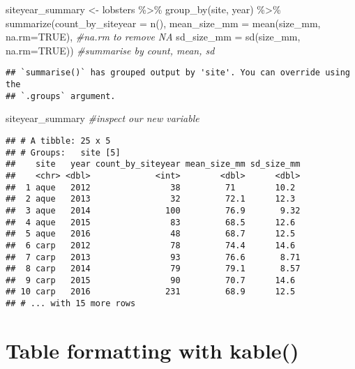 \documentclass[
]{article}
\newenvironment{Shaded}{\begin{snugshade}}{\end{snugshade}}
\newcommand{\AttributeTok}[1]{\textcolor[rgb]{0.77,0.63,0.00}{#1}}
\newcommand{\CommentTok}[1]{\textcolor[rgb]{0.56,0.35,0.01}{\textit{#1}}}
\newcommand{\ConstantTok}[1]{\textcolor[rgb]{0.00,0.00,0.00}{#1}}
\newcommand{\FunctionTok}[1]{\textcolor[rgb]{0.00,0.00,0.00}{#1}}
\newcommand{\NormalTok}[1]{#1}
\newcommand{\OtherTok}[1]{\textcolor[rgb]{0.56,0.35,0.01}{#1}}
\newcommand{\SpecialCharTok}[1]{\textcolor[rgb]{0.00,0.00,0.00}{#1}}
\begin{document}
\begin{Shaded}
\begin{Highlighting}[]
\NormalTok{siteyear\_summary }\OtherTok{\textless{}{-}}\NormalTok{ lobsters }\SpecialCharTok{\%\textgreater{}\%}
  \FunctionTok{group\_by}\NormalTok{(site, year) }\SpecialCharTok{\%\textgreater{}\%}
  \FunctionTok{summarize}\NormalTok{(}\AttributeTok{count\_by\_siteyear =}  \FunctionTok{n}\NormalTok{(), }
            \AttributeTok{mean\_size\_mm =} \FunctionTok{mean}\NormalTok{(size\_mm, }\AttributeTok{na.rm=}\ConstantTok{TRUE}\NormalTok{), }\CommentTok{\#na.rm to remove NA}
            \AttributeTok{sd\_size\_mm =} \FunctionTok{sd}\NormalTok{(size\_mm, }\AttributeTok{na.rm=}\ConstantTok{TRUE}\NormalTok{)) }\CommentTok{\#summarise by count, mean, sd}
\end{Highlighting}
\end{Shaded}

\begin{verbatim}
## `summarise()` has grouped output by 'site'. You can override using the
## `.groups` argument.
\end{verbatim}

\begin{Shaded}
\begin{Highlighting}[]
\NormalTok{siteyear\_summary }\CommentTok{\#inspect our new variable}
\end{Highlighting}
\end{Shaded}

\begin{verbatim}
## # A tibble: 25 x 5
## # Groups:   site [5]
##    site   year count_by_siteyear mean_size_mm sd_size_mm
##    <chr> <dbl>             <int>        <dbl>      <dbl>
##  1 aque   2012                38         71        10.2 
##  2 aque   2013                32         72.1      12.3 
##  3 aque   2014               100         76.9       9.32
##  4 aque   2015                83         68.5      12.6 
##  5 aque   2016                48         68.7      12.5 
##  6 carp   2012                78         74.4      14.6 
##  7 carp   2013                93         76.6       8.71
##  8 carp   2014                79         79.1       8.57
##  9 carp   2015                90         70.7      14.6 
## 10 carp   2016               231         68.9      12.5 
## # ... with 15 more rows
\end{verbatim}

\hypertarget{table-formatting-with-kable}{%
\section{Table formatting with
kable()}\label{table-formatting-with-kable}}
\end{document}
